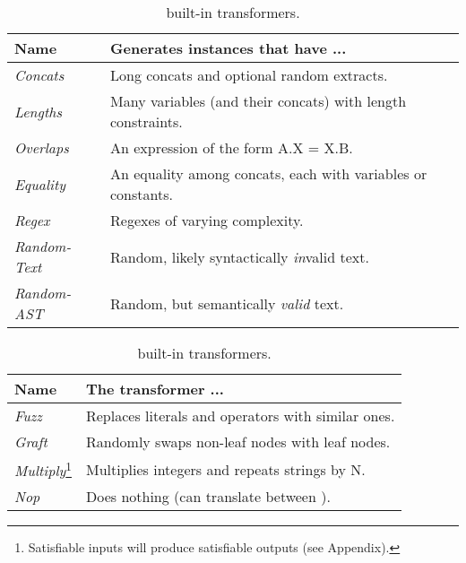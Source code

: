 \begin{table}[t]
    \caption{\fuzzer{} built-in (a) generators and (b) transformers.}
    \begin{subtable}{1\textwidth}
        \centering
        \caption{\generator{} built-in generators.}
        \label{tbl:generators}
        \begin{tabular}{ l l }
            \toprule
            \textbf{Name}
            & \textbf{Generates instances that have ...} \\
            \midrule
            \textit{Concats}
            & Long concats and optional random extracts. \\
            \textit{Lengths}
            & Many variables (and their concats) with length constraints. \\
            \textit{Overlaps}
            & An expression of the form A.X = X.B. \\
            \textit{Equality}
            & An equality among concats, each with variables or constants. \\
            \textit{Regex}
            & Regexes of varying complexity. \\
            \textit{Random-Text}
            & Random, likely syntactically \textit{in}valid text. \\
            \textit{Random-AST}
            & Random, but semantically \textit{valid} text. \\
            \bottomrule
        \end{tabular}
    \end{subtable}
    \begin{subtable}{1\textwidth}
        \centering
        \caption{\transformer{} built-in transformers.}
        \label{tbl:transformers}
        \begin{tabular}{l l}
            \toprule
            \textbf{Name}
            & \textbf{The transformer ...} \\
            \midrule
            \textit{Fuzz}
            & Replaces literals and operators with similar ones.\\
            \textit{Graft}
            & Randomly swaps non-leaf nodes with leaf nodes.\\
            \textit{Multiply}\footnote{Satisfiable inputs
            will produce satisfiable outputs (see Appendix).}
            & Multiplies integers and repeats strings by N.\\
            \textit{Nop}
            & Does nothing (can translate between \smtfull{}).\\

\end{tabular}
\end{subtable}
\end{table}
